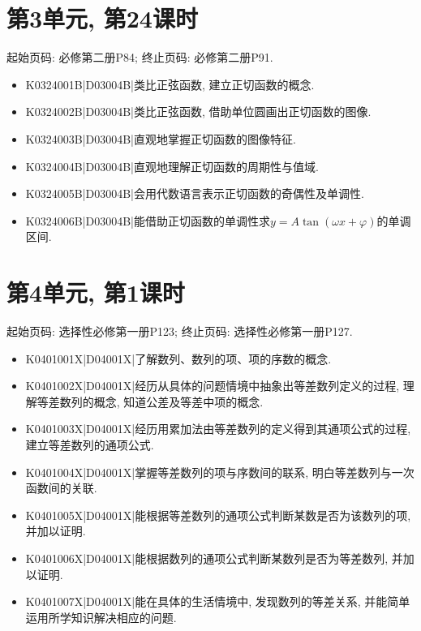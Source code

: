 \section*{第3单元, 第24课时}
起始页码: 必修第二册P84; 终止页码: 必修第二册P91.
\begin{itemize}
\item K0324001B|D03004B|类比正弦函数, 建立正切函数的概念.
\item K0324002B|D03004B|类比正弦函数, 借助单位圆画出正切函数的图像.
\item K0324003B|D03004B|直观地掌握正切函数的图像特征.
\item K0324004B|D03004B|直观地理解正切函数的周期性与值域.
\item K0324005B|D03004B|会用代数语言表示正切函数的奇偶性及单调性.
\item K0324006B|D03004B|能借助正切函数的单调性求$y=A\tan(\omega x+\varphi)$的单调区间.
\end{itemize}

\section*{第4单元, 第1课时}
起始页码: 选择性必修第一册P123; 终止页码: 选择性必修第一册P127.
\begin{itemize}
\item K0401001X|D04001X|了解数列、数列的项、项的序数的概念.
\item K0401002X|D04001X|经历从具体的问题情境中抽象出等差数列定义的过程, 理解等差数列的概念, 知道公差及等差中项的概念.
\item K0401003X|D04001X|经历用累加法由等差数列的定义得到其通项公式的过程, 建立等差数列的通项公式.
\item K0401004X|D04001X|掌握等差数列的项与序数间的联系, 明白等差数列与一次函数间的关联.
\item K0401005X|D04001X|能根据等差数列的通项公式判断某数是否为该数列的项, 并加以证明.
\item K0401006X|D04001X|能根据数列的通项公式判断某数列是否为等差数列, 并加以证明.
\item K0401007X|D04001X|能在具体的生活情境中, 发现数列的等差关系, 并能简单运用所学知识解决相应的问题.
\end{itemize}

